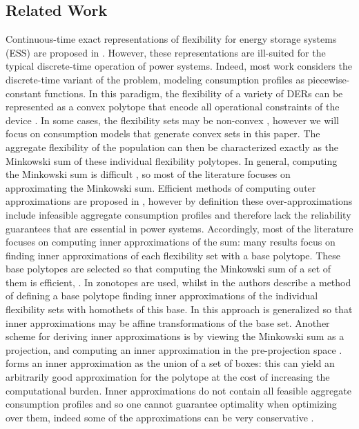 \subsection{Related Work}
Continuous-time exact representations of flexibility for energy storage systems (ESS) are proposed in \cite{Evans2020AResources, Zachary2021SchedulingStorage}. However,  these representations are ill-suited for the typical discrete-time operation of power systems. Indeed, most work considers the discrete-time variant of the problem, modeling consumption profiles as piecewise-constant functions. In this paradigm, the flexibility of a variety of DERs can be represented as a convex polytope that encode all operational constraints of the device \cite{Trangbaek2011ExactControl, Zhao2017ALoads, Hao2015AggregateLoads}. In some cases, the flexibility sets may be non-convex \cite{Taha2024WhenConvex}, however we will focus on consumption models that generate convex sets in this paper.
The aggregate flexibility of the population can then be characterized exactly as the Minkowski sum of these individual flexibility polytopes. In general, computing the Minkowski sum is difficult \cite{Tiwary2008OnPolytopes}, so most of the literature focuses on approximating the Minkowski sum. Efficient methods of computing outer approximations are proposed in \cite{Barot2017APolytopes, Wen2022AggregateModels}, however by definition these over-approximations include infeasible aggregate consumption profiles and therefore lack the reliability guarantees that are essential in power systems. Accordingly, most of the literature focuses on computing inner approximations of the sum:  many results focus on finding inner approximations of each flexibility set with a base polytope. These base polytopes are selected so that computing the Minkowski sum of a set of them is efficient, \cite{Kundu2018ApproximatingApproach, Muller2019AggregationResources,Alizadeh2014CapturingResponse, Taha2024AnPopulations}. In \cite{Muller2019AggregationResources} zonotopes are used,
whilst in \cite{Zhao2017ALoads} the authors describe a method of defining a base polytope finding inner approximations of the individual flexibility sets with homothets of this base. In \cite{Taha2024AnPopulations} this approach is generalized so that inner approximations may be affine transformations of the base set. Another scheme for deriving inner approximations is by viewing the Minkowski sum as a projection, and computing an inner approximation in the pre-projection space \cite{Zhao2016ExtractingApproximation}. \cite{Nazir2018InnerResources} forms an inner approximation as the union of a set of boxes: this can yield an arbitrarily good approximation for the polytope at the cost of increasing the computational burden. Inner approximations do not contain all feasible aggregate consumption profiles and so one cannot guarantee optimality when optimizing over them, indeed some of the approximations can be very conservative \cite{Ozturk2022AggregationAlgorithms}.
